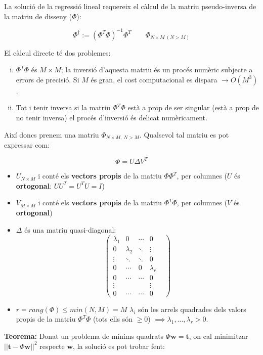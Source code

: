 \documentclass[a4paper]{article}
\begin{document}
La solució de la regressió lineal requereix el càlcul de la matriu pseudo-inversa de la matriu de disseny ($\Phi$):

$$ \Phi^{\dag} := ( \Phi^T \Phi)^{-1} \Phi^T \qquad \Phi_{N \times M \ (N > M)} $$

El càlcul directe té dos problemes:
\begin{enumerate}[i)]
	\item $\Phi^T \Phi$ és $M \times M$; la inversió d'aquesta matriu és un procés numèric subjecte a errors de precisió. Si $M$ és gran, el cost computacional es dispara $\rightarrow O(M^3)$.
	\item Tot i tenir inversa si la matriu $\Phi^T \Phi$ està a prop de ser singular (està a prop de no tenir inversa) el procés d'inversió és delicat numèricament.
\end{enumerate}

Així doncs prenem una matriu $\Phi_{N \times M, \ N > M}$. Qualsevol tal matriu es pot expressar com:

$$
\Phi = U \Delta V^T
$$

\begin{itemize}
	\item $U_{N \times M}$ i conté els \textbf{vectors propis} de la matriu $\Phi \Phi^T$, per columnes ($U$ és \textbf{ortogonal}: $U U^T = U^T U = I$)
	\item $V_{M \times M}$ i conté els \textbf{vectors propis} de la matriu $\Phi^T \Phi$, per columnes ($V$ és \textbf{ortogonal})
	\item $\Delta$ és una matriu quasi-diagonal:
	$$
	\begin{pmatrix}
	\lambda_1 & 0 & \cdots &  0 \\
	0 & \lambda_2 & \ddots &  \vdots \\
	\vdots & \ddots & \ddots & 0 & \\
	0 & \cdots & 0 &\lambda_r \\
	0 & \cdots & \cdots & 0 \\
	\vdots & & & \vdots \\
	0 & \cdots & \cdots & 0
	\end{pmatrix}
	$$
	
	\item  $r = rang(\Phi) \le min(N,M) = M$ $\lambda_i$ són les arrels quadrades dels valors propis de la matriu $\Phi^T \Phi$ (tots ells són $\ge 0$) $\implies \lambda_1, ...,\lambda_r > 0$.
\end{itemize}

\textbf{Teorema:} Donat un problema de mínims quadrats $ \Phi \boldsymbol{w} = \boldsymbol{t} $, on cal minimitzar $ ||\boldsymbol{t} - \Phi \boldsymbol{w} ||^2 $ respecte $\boldsymbol{w}$, la solució es pot trobar fent:
\end{document}
